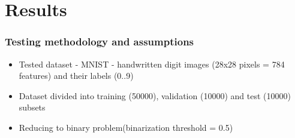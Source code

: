 \documentclass{beamer}
\begin{document}
  \section{Results}
  \begin{frame}
  \frametitle{Testing methodology and assumptions}
  \begin{itemize}
	\item Tested dataset - MNIST - handwritten digit images (28x28 pixels = 784 features) and their labels (0..9)
	\item Dataset divided into training (50000), validation (10000) and test (10000) subsets 
	\item Reducing to binary problem(binarization threshold = 0.5)
	\end{itemize}
  \end{frame}
  
\end{document}
